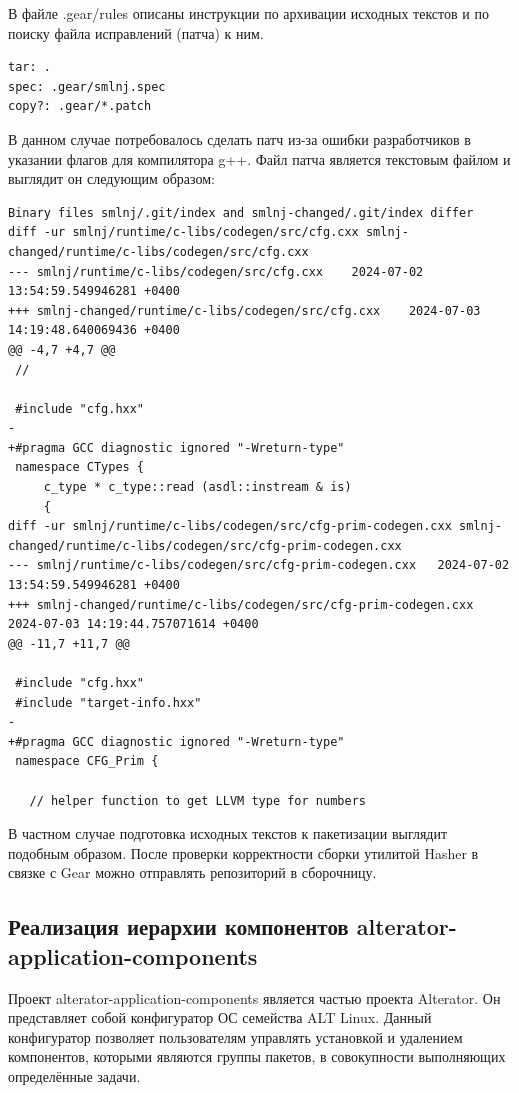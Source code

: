 \documentclass[bachelor, och, pract]{SCWorks}
\begin{document}
В файле .gear/rules описаны инструкции по архивации исходных текстов и по поиску файла исправлений (патча) к ним.

\begin{verbatim}
tar: .
spec: .gear/smlnj.spec
copy?: .gear/*.patch
\end{verbatim}

В данном случае потребовалось сделать патч из-за ошибки разработчиков в указании флагов для компилятора g++.
Файл патча является текстовым файлом и выглядит он следующим образом:

\begin{verbatim}
Binary files smlnj/.git/index and smlnj-changed/.git/index differ
diff -ur smlnj/runtime/c-libs/codegen/src/cfg.cxx smlnj-changed/runtime/c-libs/codegen/src/cfg.cxx
--- smlnj/runtime/c-libs/codegen/src/cfg.cxx	2024-07-02 13:54:59.549946281 +0400
+++ smlnj-changed/runtime/c-libs/codegen/src/cfg.cxx	2024-07-03 14:19:48.640069436 +0400
@@ -4,7 +4,7 @@
 //
 
 #include "cfg.hxx"
-
+#pragma GCC diagnostic ignored "-Wreturn-type"
 namespace CTypes {
     c_type * c_type::read (asdl::instream & is)
     {
diff -ur smlnj/runtime/c-libs/codegen/src/cfg-prim-codegen.cxx smlnj-changed/runtime/c-libs/codegen/src/cfg-prim-codegen.cxx
--- smlnj/runtime/c-libs/codegen/src/cfg-prim-codegen.cxx	2024-07-02 13:54:59.549946281 +0400
+++ smlnj-changed/runtime/c-libs/codegen/src/cfg-prim-codegen.cxx	2024-07-03 14:19:44.757071614 +0400
@@ -11,7 +11,7 @@
 
 #include "cfg.hxx"
 #include "target-info.hxx"
-
+#pragma GCC diagnostic ignored "-Wreturn-type"
 namespace CFG_Prim {
 
   // helper function to get LLVM type for numbers
\end{verbatim}

В частном случае подготовка исходных текстов к пакетизации выглядит подобным образом.
После проверки корректности сборки утилитой Hasher в связке с Gear можно отправлять репозиторий в сборочницу.

\subsection{Реализация иерархии компонентов alterator-application-components}

Проект alterator-application-components является частью проекта Alterator.
Он представляет собой конфигуратор ОС семейства ALT Linux.
Данный конфигуратор позволяет пользователям управлять установкой и удалением компонентов, которыми являются группы пакетов, в совокупности выполняющих определённые задачи.
\end{document}

